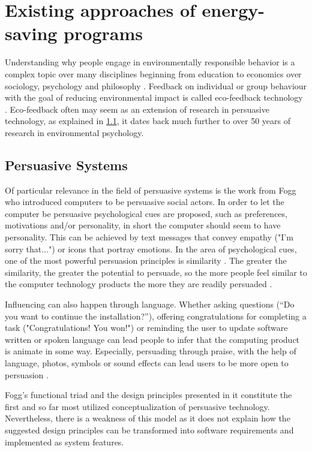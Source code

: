 \section{Existing approaches of energy-saving programs}

Understanding why people engage in environmentally responsible behavior is a complex topic over many disciplines beginning from education to economics over sociology, psychology and philosophy \cite{froehlich2010design}. Feedback on individual or group behaviour with the goal of reducing environmental impact is called eco-feedback technology \cite{mccalley1998computer, holstius2004infotropism, froehlich2010design}. Eco-feedback often may seem as an extension of research in persuasive technology, as explained in  \ref{chap:persuasivesystem}, it dates back much further to over 50 years of research in environmental psychology.

\subsection{Persuasive Systems}
\label{chap:persuasivesystem}

Of particular relevance in the field of persuasive systems is the work from Fogg \cite{fogg2002persuasive} who introduced computers to be persuasive social actors. In order to let the computer be persuasive psychological cues are proposed, such as preferences, motivations and/or personality, in short the computer should seem to have personality. This can be achieved by text messages that convey empathy ("I'm sorry that...") or icons that portray emotions. In the area of psychological cues, one of the most powerful persuasion principles is similarity \cite{tajfel2010social}. The greater the similarity, the greater the potential to persuade, so the more people feel similar to the computer technology products the more they are readily persuaded \cite{fogg2002persuasive}.

Influencing can also happen through language. Whether asking questions
(“Do you want to continue the installation?”), offering congratulations for
completing a task ("Congratulations! You won!") or reminding the user to update software written or spoken language can lead people to infer that the computing product is animate in some way. Especially, persuading through praise, with the help of language, photos, symbols or sound effects can lead users to be more open to persuasion \cite{fogg2002persuasive}.

Fogg’s \cite{fogg2002persuasive} functional triad and the design principles presented in it constitute the first and so far most utilized conceptualization of persuasive technology. Nevertheless, there is a weakness of this model as it does not explain how the suggested design principles can be transformed into software requirements and implemented as system features.

